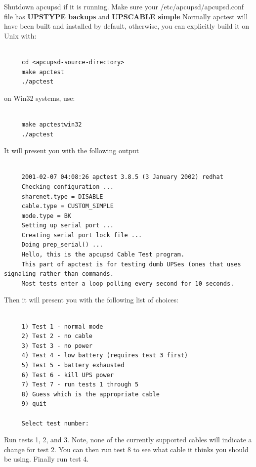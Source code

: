 {{{{{{{{{{Shutdown apcupsd if it is running. Make sure your /etc/apcupsd/apcupsd.conf
file has {\bf UPSTYPE backups} and {\bf UPSCABLE simple} Normally apctest will
have been built and installed by default, otherwise, you can explicitly build
it on Unix with: 

\footnotesize
\begin{verbatim}
     
     cd <apcupsd-source-directory>
     make apctest
     ./apctest
\end{verbatim}
\normalsize

on Win32 systems, use: 

\footnotesize
\begin{verbatim}
     
     make apctestwin32
     ./apctest
\end{verbatim}
\normalsize

It will present you with the following output 

\footnotesize
\begin{verbatim}
     
     2001-02-07 04:08:26 apctest 3.8.5 (3 January 2002) redhat
     Checking configuration ...
     sharenet.type = DISABLE
     cable.type = CUSTOM_SIMPLE
     mode.type = BK
     Setting up serial port ...
     Creating serial port lock file ...
     Doing prep_serial() ...
     Hello, this is the apcupsd Cable Test program.
     This part of apctest is for testing dumb UPSes (ones that uses signaling rather than commands.
     Most tests enter a loop polling every second for 10 seconds.
\end{verbatim}
\normalsize

Then it will present you with the following list of choices: 

\footnotesize
\begin{verbatim}
     
     1) Test 1 - normal mode
     2) Test 2 - no cable
     3) Test 3 - no power
     4) Test 4 - low battery (requires test 3 first)
     5) Test 5 - battery exhausted
     6) Test 6 - kill UPS power
     7) Test 7 - run tests 1 through 5
     8) Guess which is the appropriate cable
     9) quit
     
     Select test number:
\end{verbatim}
\normalsize

Run tests 1, 2, and 3. Note, none of the currently supported cables will
indicate a change for test 2. You can then run test 8 to see what cable it
thinks you should be using. Finally run test 4.  

}}}}}}}}}}
